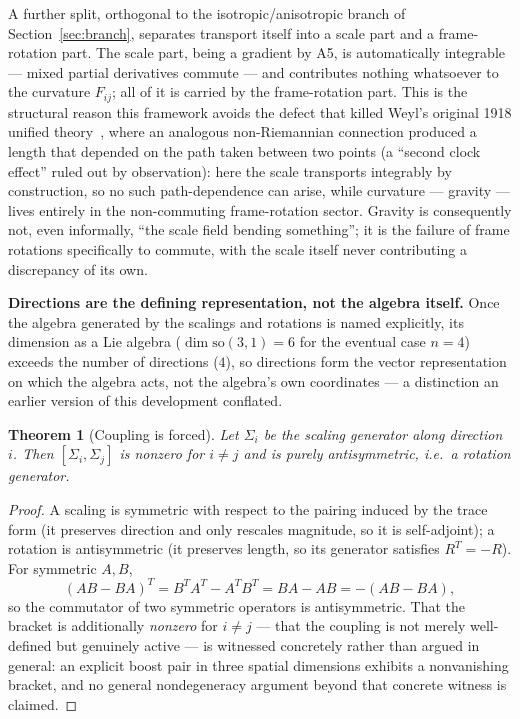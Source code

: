 \documentclass[pdflatex,sn-mathphys-num]{sn-jnl}
\theoremstyle{thmstyleone}
\newtheorem{theorem}{Theorem}
\theoremstyle{thmstylethree}
\theoremstyle{thmstyletwo}
\begin{document}
A further split, orthogonal to the isotropic/anisotropic branch of
Section~\ref{sec:branch}, separates transport itself into a scale part
and a frame-rotation part. The scale part, being a gradient by A5, is
automatically integrable — mixed partial derivatives commute — and
contributes nothing whatsoever to the curvature $F_{ij}$; all of it is
carried by the frame-rotation part. This is the structural reason this
framework avoids the defect that killed Weyl's original 1918 unified
theory~\cite{Weyl1918}, where an analogous non-Riemannian connection
produced a length that depended on the path taken between two points (a
``second clock effect'' ruled out by observation): here the scale
transports integrably by construction, so no such path-dependence can
arise, while curvature — gravity — lives entirely in the
non-commuting frame-rotation sector. Gravity is consequently not, even
informally, ``the scale field bending something''; it is the failure of
frame rotations specifically to commute, with the scale itself never
contributing a discrepancy of its own.

\textbf{Directions are the defining representation, not the algebra
itself.} Once the algebra generated by the scalings and rotations is
named explicitly, its dimension as a Lie algebra ($\dim\mathrm{so}(3,1)=6$
for the eventual case $n=4$) exceeds the number of directions ($4$), so
directions form the vector representation on which the algebra acts, not
the algebra's own coordinates — a distinction an earlier version of this
development conflated.

\begin{theorem}[Coupling is forced]\label{thm:coupling}
Let $\Sigma_i$ be the scaling generator along direction $i$. Then
$[\Sigma_i,\Sigma_j]$ is nonzero for $i\neq j$ and is purely
antisymmetric, i.e.\ a rotation generator.
\end{theorem}
\begin{proof}
A scaling is symmetric with respect to the pairing induced by the trace
form (it preserves direction and only rescales magnitude, so it is
self-adjoint); a rotation is antisymmetric (it preserves length, so its
generator satisfies $R^T = -R$). For symmetric $A,B$,
\[
(AB-BA)^T = B^TA^T - A^TB^T = BA - AB = -(AB-BA),
\]
so the commutator of two symmetric operators is antisymmetric. That the
bracket is additionally \emph{nonzero} for $i\neq j$ — that the coupling
is not merely well-defined but genuinely active — is witnessed concretely
rather than argued in general: an explicit boost pair in three spatial
dimensions exhibits a nonvanishing bracket, and no general
nondegeneracy argument beyond that concrete witness is claimed.
\end{proof}
\end{document}
